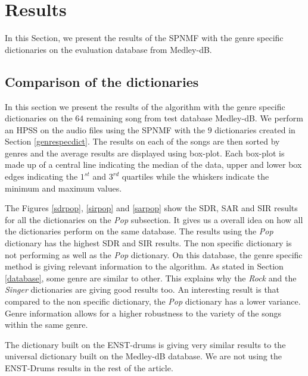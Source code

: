 \documentclass{article}
\begin{document}
\section{Results}

In this Section, we present the results of the SPNMF with the genre specific dictionaries on the evaluation database from Medley-dB.

\subsection{Comparison of the dictionaries}

In this section we present the results of the algorithm with the genre specific dictionaries on the $64$ remaining song from test database Medley-dB. We perform an HPSS on the audio files using the SPNMF with the $9$ dictionaries created in Section \ref{genrespecdict}. The results on each of the songs are then sorted by genres and the average results are displayed using box-plot. Each box-plot is made up of a central line indicating the median of the data, upper and lower box edges indicating the $1^{st}$ and $3^{rd}$ quartiles while the whiskers indicate the minimum and maximum values. 


The Figures \ref{sdrpop}, \ref{sirpop} and \ref{sarpop} show the SDR, SAR and SIR results for all the dictionaries on the \emph{Pop} subsection. It gives us a overall idea on how all the dictionaries perform on the same database. The results using the \emph{Pop} dictionary has the highest SDR and SIR results. The non specific dictionary is not performing as well as the \emph{Pop} dictionary. On this database, the genre specific method is giving relevant information to the algorithm. As stated in Section \ref{database}, some genre are similar to other. This explains why the \emph{Rock} and the \emph{Singer} dictionaries are giving good results too. 
An interesting result is that compared to the non specific dictionary, the \emph{Pop} dictionary has a lower variance. Genre information allows for a higher robustness to the variety of the songs within the same genre.  

The dictionary built on the ENST-drums is giving very similar results to the universal dictionary built on the Medley-dB database. We are not using the ENST-Drums results in the rest of the article. 
\end{document}
